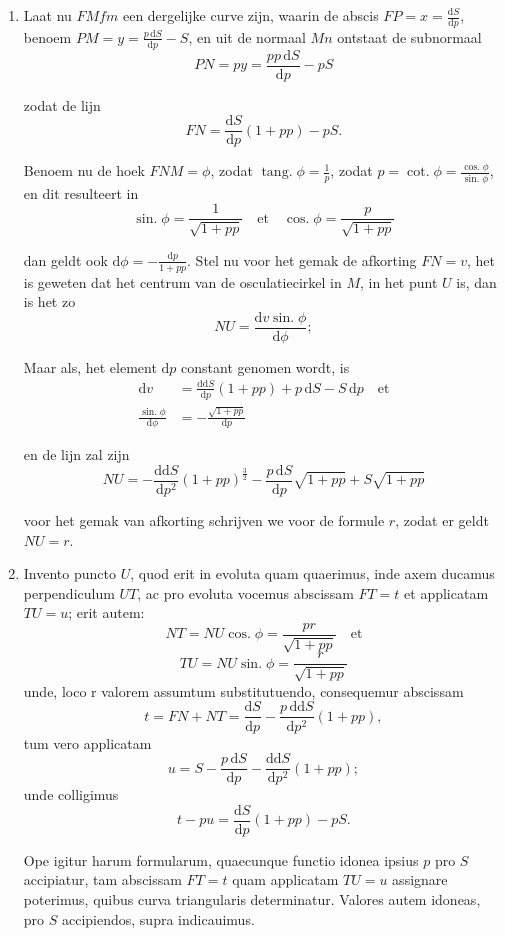\documentclass[10pt,a4paper]{article}
\newcommand{\switchenum}{\setcounter{enumi}{\arabic{enumi}-1}\switchcolumn}
\DeclareMathOperator{\tang}{tang.}
\DeclareMathOperator{\cotg}{cot.}
\DeclareMathOperator{\sing}{sin.}
\DeclareMathOperator{\cosg}{cos.}
\def\D{\mathrm{d}}
\begin{document}
\begin{paracol}{2}
\begin{enumerate}[topsep=1px]
		\switchenum
		\item Laat nu $FMfm$ een dergelijke curve zijn, waarin de abscis $FP=x=\frac{\D S}{\D p}$, benoem $PM=y=\frac{p\, \D S}{\D p}-S$, en uit de normaal $Mn$ ontstaat de subnormaal
		\[
			PN = py = \frac{pp\,\D S}{\D p}-pS
		\]
		\par zodat de lijn
		\[
			FN = \frac{\D S}{\D p}(1+pp)-pS.
		\]
		\par Benoem nu de hoek $FNM = \phi$, zodat $\tang \phi = \frac{1}{p}$, zodat $p = \cotg \phi = \frac{\cosg \phi}{\sing \phi}$, en dit resulteert in
		\[
			\sing \phi = \frac{1}{\sqrt{1+pp}} \quad \text{et} \quad \cosg \phi = \frac{p}{\sqrt{1+pp}}
		\]
		\par dan geldt ook $\D \phi = -\frac{\D p}{1+pp}$. Stel nu voor het gemak de afkorting $FN=v$, het is geweten dat het centrum van de osculatiecirkel in $M$, in het punt $U$ is, dan is het zo
		\[
			NU = \frac{\D v\sing \phi}{\D \phi};
		\]
		\par Maar als, het element $\D p$ constant genomen wordt, is
		\begin{align*}
			\D  v &= \frac{\D \D  S}{\D p}(1+pp)+p\,\D S-S\,\D p \quad \text{et}\\
			\frac{\sing \phi}{\D \phi} &= -\frac{\sqrt{1+pp}}{\D p}
		\end{align*}
		\par en de lijn zal zijn
		\[
			NU = -\frac{\D\D S}{\D p^2} (1+pp)^{\frac{3}{2}}-\frac{p\,\D S}{\D p} \sqrt{1+pp} + S\sqrt{1+pp}
		\]
		\par voor het gemak van afkorting schrijven we voor de formule $r$, zodat er geldt $NU=r$.

		\switchcolumn*
		
		\item Invento puncto $U$, quod erit in evoluta quam quaerimus, inde axem ducamus perpendiculum $UT$, ac pro evoluta vocemus abscissam $FT=t$ et applicatam $TU=u$; erit autem:
		\[
			NT = NU \cosg \phi = \frac{pr}{\sqrt{1+pp}} \quad \text{et}
		\]
		\[
			TU = NU \sing \phi = \frac{r}{\sqrt{1+pp}}
		\]
		unde, loco r valorem assumtum substitutuendo, consequemur abscissam
		\[
			t = FN + NT = \frac{\D S}{\D p} - \frac{p\,\D\D S}{\D p^2} (1+pp),
		\]
		tum vero applicatam
		\[
			u = S - \frac{p\, \D S}{\D p}-\frac{\D \D S}{\D p^2}(1+pp);
		\]
		unde colligimus
		\[
			t-pu = \frac{\D S}{\D p}(1+pp)-pS.
		\]
		\par Ope igitur harum formularum, quaecunque functio idonea ipsius $p$ pro $S$ accipiatur, tam abscissam $FT = t$ quam applicatam $TU=u$ assignare poterimus, quibus curva triangularis determinatur. Valores autem idoneas, pro $S$ accipiendos, supra indicauimus.
		

\end{enumerate}
\end{paracol}
\end{document}
